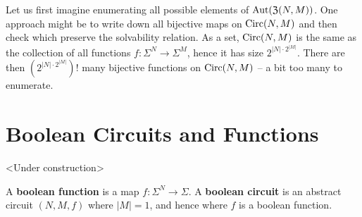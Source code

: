 \documentclass{article}
\begin{document}
Let us first imagine enumerating all possible elements of $\operatorname{Aut}(\operatorname{\mathfrak{Z}}(N,M))$. One approach might be to write down all bijective maps on $\operatorname{Circ}(N,M)$ and then check which preserve the solvability relation. As a set, $\operatorname{Circ}(N,M)$ is the same as the collection of all functions $f:\Sigma^N \to \Sigma^M$, hence it has size $2^{|N|\cdot 2^{|M|}}$. There are then $\left(2^{|N|\cdot 2^{|M|}}\right)!$ many bijective functions on $\operatorname{Circ}(N,M)$ -- a bit too many to enumerate.

\section{Boolean Circuits and Functions}\label{sec:bool_circuits}
\begin{center}
  <Under construction>
\end{center}

A \textbf{boolean function} is a map $f:\Sigma^N \to \Sigma$. A \textbf{boolean circuit} is an abstract circuit $(N, M, f)$ where $|M| = 1$, and hence where $f$ is a boolean function.
\end{document}
